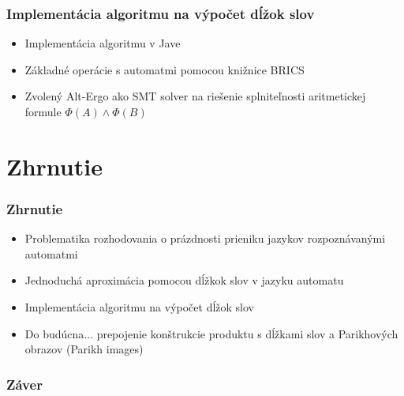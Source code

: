 \documentclass[xcolor=dvipsnames]{beamer}
\begin{document}
\begin{frame}
\frametitle{Implementácia algoritmu na výpočet dĺžok slov}
\begin{itemize}
\item Implementácia algoritmu v Jave
\item Základné operácie s automatmi pomocou knižnice BRICS
\item Zvolený Alt-Ergo ako SMT solver na riešenie splniteľnosti aritmetickej formule $\Phi(A) \wedge  \Phi(B)$
\end{itemize}
\end{frame}


\section{Zhrnutie}

\begin{frame}
\frametitle{Zhrnutie}
\begin{itemize}
\item Problematika rozhodovania o prázdnosti prieniku jazykov rozpoznávanými automatmi
\item Jednoduchá aproximácia pomocou dĺžkok slov v jazyku automatu
\item Implementácia algoritmu na výpočet dĺžok slov
\item Do budúcna... prepojenie konštrukcie produktu s dĺžkami slov a Parikhových obrazov (Parikh images)
\end{itemize}
\end{frame}

\begin{frame}
\frametitle{Záver}
\end{frame}
 
\end{document}
